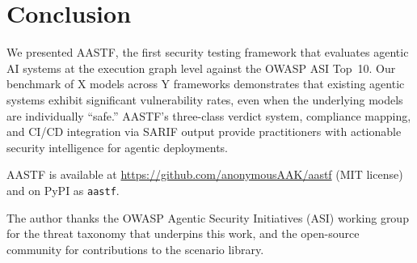 \documentclass{article}
\begin{document}
\section{Conclusion}
\label{sec:conclusion}

We presented AASTF, the first security testing framework that evaluates
agentic AI systems at the execution graph level against the OWASP ASI
Top~10. Our benchmark of X models across Y frameworks demonstrates that
existing agentic systems exhibit significant vulnerability rates, even
when the underlying models are individually ``safe.'' AASTF's three-class
verdict system, compliance mapping, and CI/CD integration via SARIF output
provide practitioners with actionable security intelligence for agentic
deployments.

AASTF is available at \url{https://github.com/anonymousAAK/aastf}
(MIT license) and on PyPI as \texttt{aastf}.

\begin{ack}
The author thanks the OWASP Agentic Security Initiatives (ASI) working
group for the threat taxonomy that underpins this work, and the
open-source community for contributions to the scenario library.
\end{ack}


\end{document}
